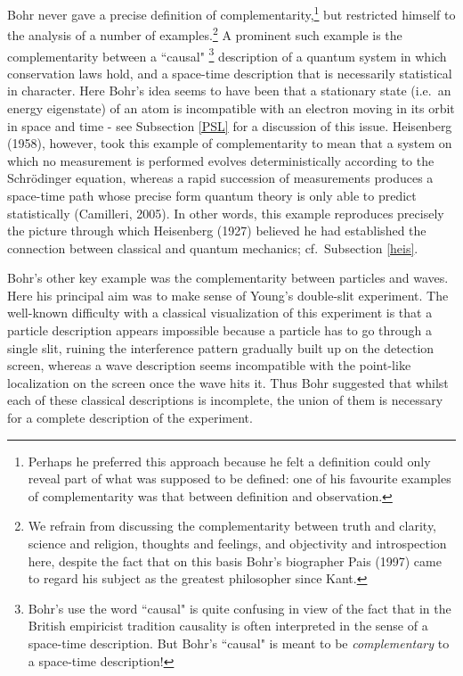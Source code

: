 \documentclass[12pt,titlepage]{article}
\begin{document}
Bohr never gave a precise definition of complementarity,\footnote{Perhaps he preferred this approach because he felt a definition could only reveal part of what was supposed to be defined: one of his favourite examples of complementarity was that between definition and observation.} but restricted himself to the analysis of a number of examples.\footnote{We refrain from discussing the complementarity between truth and clarity, science and religion, thoughts and feelings, and objectivity and introspection here, despite the fact that on this basis Bohr's biographer Pais (1997) came to regard his subject as the greatest philosopher since Kant.}
A prominent such example is the complementarity between
a ``causal" \footnote{\label{caudet} Bohr's use the word ``causal"  is quite confusing in view of the fact that in the British empiricist tradition causality is often interpreted in the sense of a space-time description. But Bohr's ``causal" is meant to be {\it complementary} to a space-time description!}  description of a quantum system in which conservation laws hold, and a space-time description that is necessarily statistical in character. Here Bohr's  idea seems to have been that a stationary state (i.e.\ an energy eigenstate)  of an atom is incompatible with an electron moving in its orbit in space and time - see
Subsection \ref{PSL} for a discussion of this issue. Heisenberg (1958), however, took this example of complementarity to mean that 
a system on which no measurement is performed evolves 
deterministically according to the Schr\"{o}dinger equation, whereas  a rapid succession of measurements produces a space-time path whose precise form quantum theory is only able to predict statistically (Camilleri, 2005). In other words, this example reproduces precisely the picture through  which Heisenberg (1927) believed he had established the connection between classical and quantum mechanics; cf.\ Subsection \ref{heis}. 

Bohr's other key example was the complementarity between particles and waves. Here his principal  aim was to make sense of Young's double-slit experiment. The well-known difficulty with a classical visualization of this experiment is that a particle description appears  impossible because a particle has to go through a single slit, ruining the interference pattern gradually built up on the detection screen, whereas a wave description seems incompatible with the point-like localization on the screen once the wave hits it. Thus Bohr suggested that whilst each  of these classical descriptions is incomplete, the union of them is necessary for a complete description of the experiment.
\end{document}
